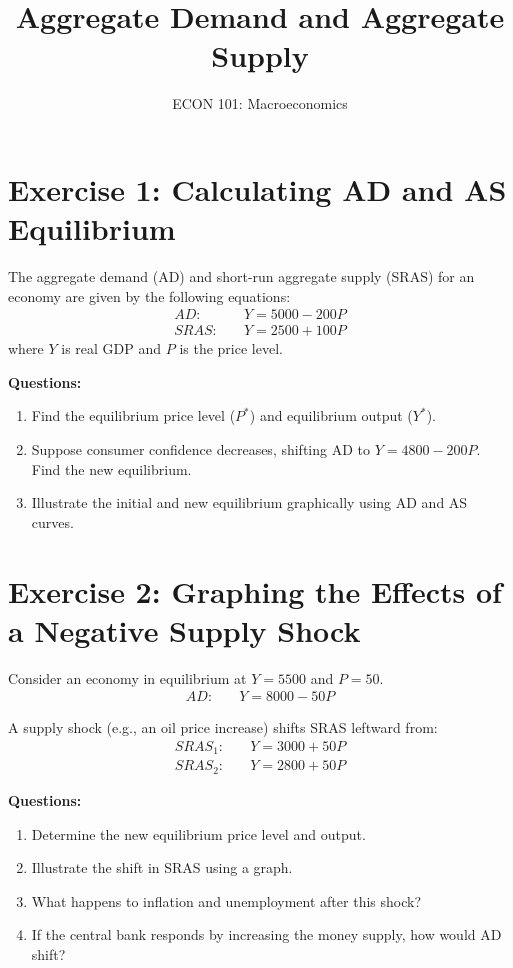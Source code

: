 \documentclass{article}
\begin{document}
\title{Aggregate Demand and Aggregate Supply}
\author{ECON 101: Macroeconomics}
\date{}
\maketitle

\section*{Exercise 1: Calculating AD and AS Equilibrium}
The aggregate demand (AD) and short-run aggregate supply (SRAS) for an economy are given by the following equations:
\begin{align*}
    AD: & \quad Y = 5000 - 200P \\
    SRAS: & \quad Y = 2500 + 100P
\end{align*}
where \(Y\) is real GDP and \(P\) is the price level.

\textbf{Questions:}
\begin{enumerate}
    \item Find the equilibrium price level (\(P^*\)) and equilibrium output (\(Y^*\)).
    \item Suppose consumer confidence decreases, shifting AD to \( Y = 4800 - 200P \). Find the new equilibrium.
    \item Illustrate the initial and new equilibrium graphically using AD and AS curves.
\end{enumerate}



\section*{Exercise 2: Graphing the Effects of a Negative Supply Shock}
Consider an economy in equilibrium at \(Y = 5500\) and \(P = 50\). \\

\begin{align*}
    AD: & \quad Y = 8000 - 50P 
\end{align*}

A supply shock (e.g., an oil price increase) shifts SRAS leftward from:
\begin{align*}
    SRAS_1: & \quad Y = 3000 + 50P \\
    SRAS_2: & \quad Y = 2800 + 50P
\end{align*}

\textbf{Questions:}
\begin{enumerate}
    \item Determine the new equilibrium price level and output.
    \item Illustrate the shift in SRAS using a graph.
    \item What happens to inflation and unemployment after this shock?
    \item If the central bank responds by increasing the money supply, how would AD shift?
\end{enumerate}
\end{document}
